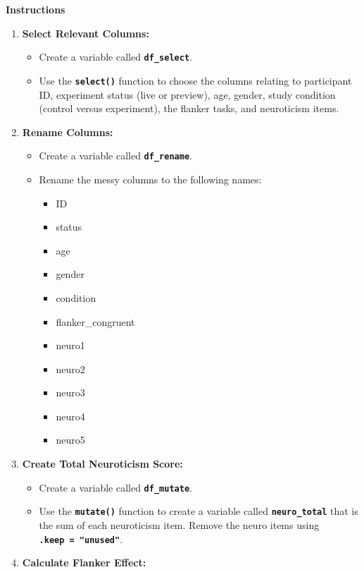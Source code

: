 \documentclass[
]{book}
\begin{document}
\textbf{Instructions}

\begin{enumerate}
\def\labelenumi{\arabic{enumi}.}
\item
  \textbf{Select Relevant Columns:}

  \begin{itemize}
  \item
    Create a variable called \textbf{\texttt{df\_select}}.
  \item
    Use the \textbf{\texttt{select()}} function to choose the columns relating to participant ID, experiment status (live or preview), age, gender, study condition (control versus experiment), the flanker tasks, and neuroticism items.
  \end{itemize}
\item
  \textbf{Rename Columns:}

  \begin{itemize}
  \item
    Create a variable called \textbf{\texttt{df\_rename}}.
  \item
    Rename the messy columns to the following names:

    \begin{itemize}
    \item
      ID
    \item
      status
    \item
      age
    \item
      gender
    \item
      condition
    \item
      flanker\_congruent
    \item
      neuro1
    \item
      neuro2
    \item
      neuro3
    \item
      neuro4
    \item
      neuro5
    \end{itemize}
  \end{itemize}
\item
  \textbf{Create Total Neuroticism Score:}

  \begin{itemize}
  \item
    Create a variable called \textbf{\texttt{df\_mutate}}.
  \item
    Use the \textbf{\texttt{mutate()}} function to create a variable called \textbf{\texttt{neuro\_total}} that is the sum of each neuroticism item. Remove the neuro items using \textbf{\texttt{.keep\ =\ "unused"}}.
  \end{itemize}
\item
  \textbf{Calculate Flanker Effect:}


\end{enumerate}
\end{document}
